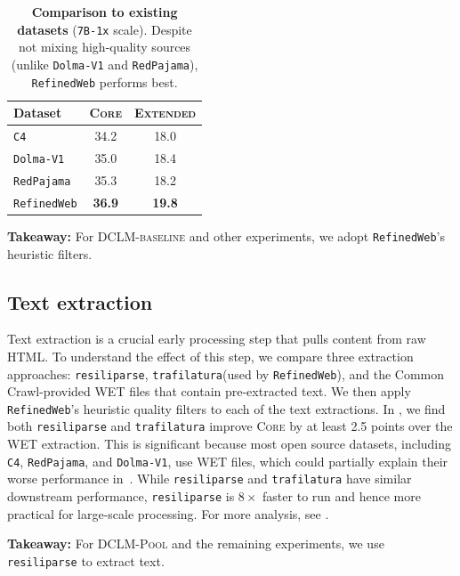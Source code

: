 \documentclass{article}
\newcommand{\takeawaybox}[1]{
  \begin{tcolorbox}[
    colback=blue!10,
    colframe=blue!50,
    boxrule=0.5pt,
    arc=0mm,
    left=5pt,
    right=5pt,
    top=2pt,
    bottom=2pt,
    fontupper={\fontsize{9.5pt}{11.75pt}\selectfont}
  ]
    \textbf{Takeaway:} #1
  \end{tcolorbox}
  \vspace*{-0.1cm}
}
\newcommand{\rawpool}{\textsc{DCLM-Pool}\xspace}
\newcommand{\hqpool}{\textsc{DCLM-baseline}\xspace}
\newcommand{\ltrack}{\texttt{7B-1x}\xspace}
\newcommand{\cfour}{\texttt{C4}\xspace}
\newcommand{\rpj}{\texttt{RedPajama}\xspace}
\newcommand{\rw}{\texttt{RefinedWeb}\xspace}
\newcommand{\dolma}{\texttt{Dolma-V1}\xspace}
\newcommand{\trafilatura}{\texttt{trafilatura}\xspace}
\newcommand{\resiliparse}{\texttt{resiliparse}\xspace}
\newcommand{\lowvar}{\textsc{Core}\xspace}
\newcommand{\aggscore}{\textsc{Extended}\xspace}
\newcommand{\commoncrawl}{Common Crawl\xspace}
\newlength{\oldintextsep}
\begin{document}
\begin{table}[b]
\centering
\caption{
\textbf{Comparison to existing datasets} (\ltrack{} scale).
Despite not mixing high-quality sources (unlike \dolma and \rpj), \rw performs best.
}
\label{tab:existing_datasets}
\begin{tabular}{lcc}
\toprule
Dataset &       \lowvar &    \aggscore \\
\midrule
 \cfour &          34.2 &          18.0 \\
 \dolma &          35.0 &          18.4 \\
   \rpj &          35.3 &          18.2 \\
    \rw & \textbf{36.9} & \textbf{19.8} \\\bottomrule
\end{tabular}
\end{table}
\setlength{\intextsep}{\oldintextsep}

\takeawaybox{For \hqpool{} and other experiments, we adopt \rw{}'s heuristic filters.}

\subsection{Text extraction}
\label{sec:text_extraction}

Text extraction is a crucial early processing step that pulls content from raw HTML. To understand the effect of this step, we compare three extraction approaches: \resiliparse, \trafilatura (used by \rw), and the \commoncrawl-provided WET files that contain pre-extracted text.
We then apply \rw{}'s heuristic quality filters to each of the text extractions.
In , we find both \resiliparse and \trafilatura improve \lowvar by at least 2.5 points over the WET extraction.
This is significant because most open source datasets, including \cfour, \rpj, and \dolma, use WET files, which could partially explain their worse performance in~.
While \resiliparse and \trafilatura have similar downstream performance, \resiliparse is $8\times$ faster to run and hence more practical for large-scale processing.
For more analysis, see .

\takeawaybox{For \rawpool and the remaining experiments, we use \resiliparse{} to extract text.}
\end{document}
